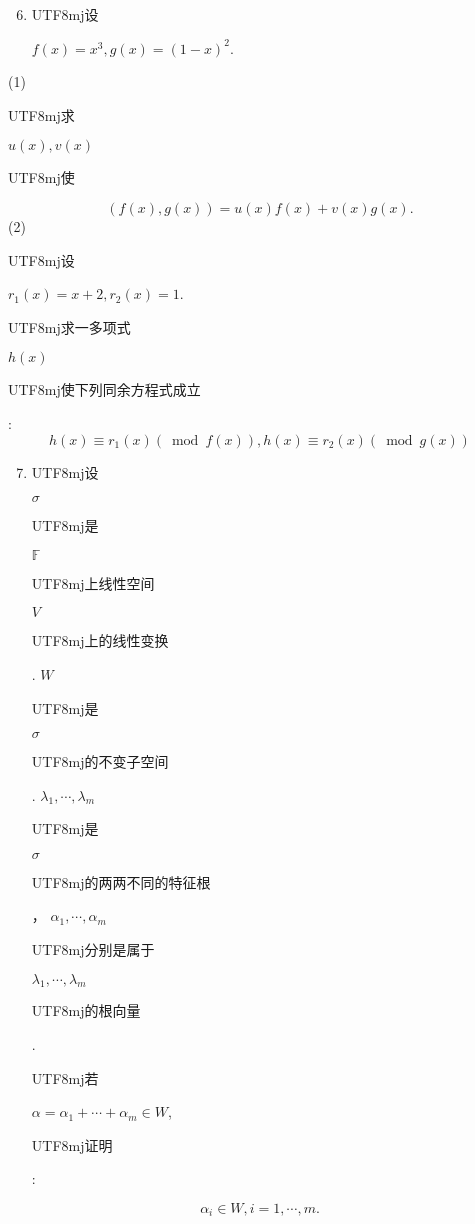 \documentclass[10pt]{article}
\begin{document}
\begin{enumerate}
  \setcounter{enumi}{5}
  \item \begin{CJK}{UTF8}{mj}设\end{CJK} $f(x)=x^{3}, g(x)=(1-x)^{2}$.
\end{enumerate}
(1) \begin{CJK}{UTF8}{mj}求\end{CJK} $u(x), v(x)$ \begin{CJK}{UTF8}{mj}使\end{CJK}
$$
(f(x), g(x))=u(x) f(x)+v(x) g(x) .
$$
(2) \begin{CJK}{UTF8}{mj}设\end{CJK} $r_{1}(x)=x+2, r_{2}(x)=1$. \begin{CJK}{UTF8}{mj}求一多项式\end{CJK} $h(x)$ \begin{CJK}{UTF8}{mj}使下列同余方程式成立\end{CJK}:
$$
h(x) \equiv r_{1}(x)(\bmod f(x)), h(x) \equiv r_{2}(x)(\bmod g(x))
$$

\begin{enumerate}
  \setcounter{enumi}{6}
  \item \begin{CJK}{UTF8}{mj}设\end{CJK} $\sigma$ \begin{CJK}{UTF8}{mj}是\end{CJK} $\mathbb{F}$ \begin{CJK}{UTF8}{mj}上线性空间\end{CJK} $V$ \begin{CJK}{UTF8}{mj}上的线性变换\end{CJK}. $W$ \begin{CJK}{UTF8}{mj}是\end{CJK} $\sigma$ \begin{CJK}{UTF8}{mj}的不变子空间\end{CJK}. $\lambda_{1}, \cdots, \lambda_{m}$ \begin{CJK}{UTF8}{mj}是\end{CJK} $\sigma$ \begin{CJK}{UTF8}{mj}的两两不同的特征根\end{CJK}， $\alpha_{1}, \cdots, \alpha_{m}$ \begin{CJK}{UTF8}{mj}分别是属于\end{CJK} $\lambda_{1}, \cdots, \lambda_{m}$ \begin{CJK}{UTF8}{mj}的根向量\end{CJK}. \begin{CJK}{UTF8}{mj}若\end{CJK} $\alpha=\alpha_{1}+\cdots+\alpha_{m} \in W$, \begin{CJK}{UTF8}{mj}证明\end{CJK}:
\end{enumerate}
$$
\alpha_{i} \in W, i=1, \cdots, m .
$$
\end{document}
